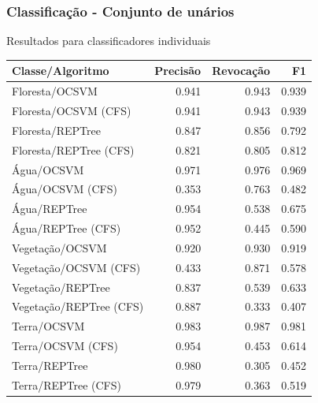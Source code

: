 \documentclass[t]{beamer}
\begin{document}
\begin{frame}[c]
	\frametitle{Classificação - Conjunto de unários}

	\centering
	Resultados para classificadores individuais

	\small{
		\begin{table}[h]
		\centering
		\begin{tabulary}{\linewidth}{|L|R|R|R|}
		\hline
		\textbf{Classe/Algoritmo} & \textbf{Precisão} & \textbf{Revocação} & \textbf{F1} \\ \hline
		Floresta/OCSVM         & 0.941 & 0.943 & 0.939 \\ \hline
		Floresta/OCSVM (CFS)   & 0.941 & 0.943 & 0.939 \\ \hline
		Floresta/REPTree        & 0.847 & 0.856 & 0.792 \\ \hline
		Floresta/REPTree (CFS)  & 0.821 & 0.805 & 0.812 \\ \hline
		Água/OCSVM             & 0.971 & 0.976 & 0.969 \\ \hline
		Água/OCSVM (CFS)       & 0.353 & 0.763 & 0.482 \\ \hline
		Água/REPTree            & 0.954 & 0.538 & 0.675 \\ \hline
		Água/REPTree (CFS)      & 0.952 & 0.445 & 0.590 \\ \hline
		Vegetação/OCSVM        & 0.920 & 0.930 & 0.919 \\ \hline
		Vegetação/OCSVM (CFS)  & 0.433 & 0.871 & 0.578 \\ \hline
		Vegetação/REPTree       & 0.837 & 0.539 & 0.633 \\ \hline
		Vegetação/REPTree (CFS) & 0.887 & 0.333 & 0.407 \\ \hline
		Terra/OCSVM            & 0.983 & 0.987 & 0.981 \\ \hline
		Terra/OCSVM (CFS)      & 0.954 & 0.453 & 0.614 \\ \hline
		Terra/REPTree           & 0.980 & 0.305 & 0.452 \\ \hline
		Terra/REPTree (CFS)     & 0.979 & 0.363 & 0.519 \\ \hline
		\end{tabulary}
		\end{table}
	}
\end{frame}
\end{document}

